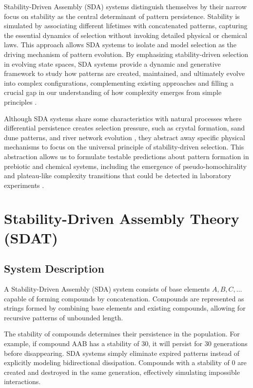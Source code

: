 \documentclass[preprint,12pt]{elsarticle}
\begin{document}
Stability-Driven Assembly (SDA) systems distinguish themselves by their narrow focus on stability as the central determinant of pattern persistence. Stability is simulated by associating different lifetimes with concatenated patterns, capturing the essential dynamics of selection without invoking detailed physical or chemical laws. This approach allows SDA systems to isolate and model selection as the driving mechanism of pattern evolution. By emphasizing stability-driven selection in evolving state spaces, SDA systems provide a dynamic and generative framework to study how patterns are created, maintained, and ultimately evolve into complex configurations, complementing existing approaches and filling a crucial gap in our understanding of how complexity emerges from simple principles \cite{lloyd2006programming, wolfram2020fundamental}.

Although SDA systems share some characteristics with natural processes where differential persistence creates selection pressure, such as crystal formation, sand dune patterns, and river network evolution \cite{ball1999self, kelso1997dynamic}, they abstract away specific physical mechanisms to focus on the universal principle of stability-driven selection. This abstraction allows us to formulate testable predictions about pattern formation in prebiotic and chemical systems, including the emergence of pseudo-homochirality and plateau-like complexity transitions that could be detected in laboratory experiments \cite{blackmond2010chiral, tononi2008phi}.


\section{Stability-Driven Assembly Theory (SDAT)}

\subsection{System Description}

A Stability-Driven Assembly (SDA) system consists of base elements \( A, B, C, \dots \) capable of forming compounds by concatenation. Compounds are represented as strings formed by combining base elements and existing compounds, allowing for recursive patterns of unbounded length.

The stability of compounds determines their persistence in the population. For example, if compound AAB has a stability of 30, it will persist for 30 generations before disappearing. SDA systems simply eliminate expired patterns instead of explicitly modeling bidirectional dissipation. Compounds with a stability of 0 are created and destroyed in the same generation, effectively simulating impossible interactions.
\end{document}
